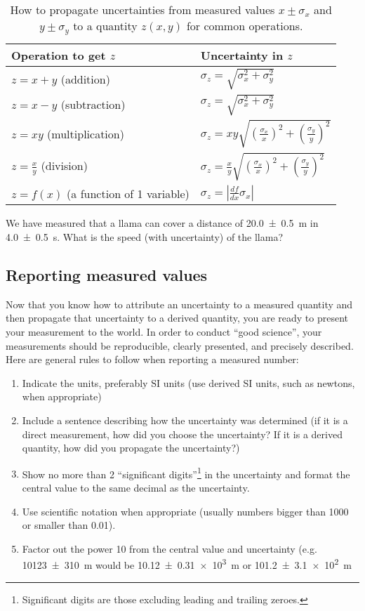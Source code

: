 \begin{table}[!h]
\centering
\begin{tabular}{p{2.5in}p{2in}} 
\textbf{Operation to get $z$} &\textbf{Uncertainty in $z$} \\
\hline
\hline
$z=x+y$ (addition) &  $\sigma_z=\sqrt{\sigma_x^2+\sigma_y^2}$ \\ \hline
$z=x-y$ (subtraction) & $\sigma_z=\sqrt{\sigma_x^2+\sigma_y^2}$ \\ \hline
$z=xy$ (multiplication) & $\sigma_z=xy\sqrt{\left(\frac{\sigma_x}{x}\right)^2+\left(\frac{\sigma_y}{y}\right)^2}$ \\ \hline
$z=\frac{x}{y}$ (division) & $\sigma_z=\frac{x}{y}\sqrt{\left(\frac{\sigma_x}{x}\right)^2+\left(\frac{\sigma_y}{y}\right)^2}$ \\ \hline
$z=f(x)$ (a function of 1 variable) &$\sigma_z=\left|\frac{df}{dx}\sigma_x \right|$ \\ \hline
\end{tabular}
\caption{\label{tab:chap2:prop_uncertainties} How to propagate uncertainties from measured values $x\pm\sigma_x$ and $y\pm\sigma_y$ to a quantity $z(x,y)$ for common operations.}
\end{table}

\begin{checkpointSA}{We have measured that a llama can cover a distance of \SI{20.0 \pm 0.5}{m} in \SI{4.0\pm 0.5}{s}. What is the speed (with uncertainty) of the llama?}
\end{checkpointSA}


\subsection{Reporting measured values}
Now that you know how to attribute an uncertainty to a measured quantity and then propagate that uncertainty to a derived quantity, you are ready to present your measurement to the world. In order to conduct ``good science'', your measurements should be reproducible, clearly presented, and precisely described. Here are general rules to follow when reporting a measured number:
\begin{enumerate}
\item Indicate the units, preferably SI units (use derived SI units, such as newtons, when appropriate)
\item Include a sentence describing how the uncertainty was determined (if it is a direct measurement, how did you choose the uncertainty? If it is a derived quantity, how did you propagate the uncertainty?)
\item Show no more than 2 ``significant digits''\footnote{Significant digits are those excluding leading and trailing zeroes.} in the uncertainty and format the central value to the same decimal as the uncertainty. 
\item Use scientific notation when appropriate (usually numbers bigger than 1000 or smaller than 0.01).
\item Factor out the power 10 from the central value and uncertainty (e.g. \SI{10123\pm 310}{m} would be \SI{10.12\pm 0.31e3}{m} or \SI{101.2\pm 3.1e2}{m} 
\end{enumerate}

